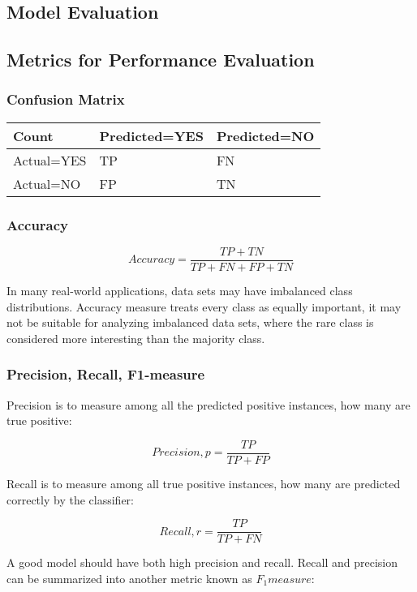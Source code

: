 \begin{multicols*}{2}
\section{Model Evaluation}

\subsection{Metrics for Performance Evaluation}

\subsubsection{Confusion Matrix}
\begin{center}
\begin{tabular}{ | l | l | l | } 
    \hline
    Count & Predicted=YES & Predicted=NO \\
    \hline
    Actual=YES & TP & FN \\
    \hline
    Actual=NO & FP & TN \\
    \hline
\end{tabular}
\end{center}

\subsubsection{Accuracy}

$$Accuracy=\frac{TP + TN}{TP + FN + FP + TN}$$

\noindent In many real-world applications, data sets may have imbalanced class distributions. Accuracy measure treats every class as equally important, it may not be suitable for analyzing imbalanced data sets, where the rare class is considered more interesting than the majority class. \\

\subsubsection{Precision, Recall, F1-measure}

\noindent Precision is to measure among all the predicted positive instances, how many are true positive:

$$Precision,p=\frac{TP}{TP + FP}$$

\noindent Recall is to measure among all true positive instances, how many are predicted correctly by the classifier:

$$Recall,r=\frac{TP}{TP+FN}$$

\noindent A good model should have both high precision and recall. Recall and precision can be summarized into another metric known as $F_1measure$:


\end{multicols*}
